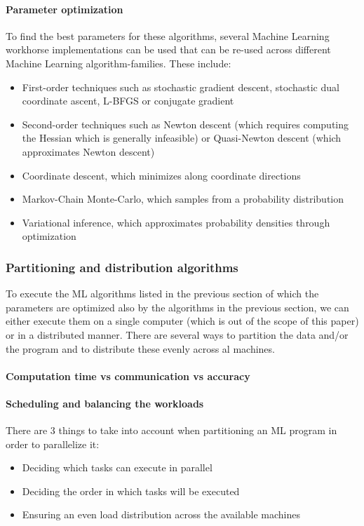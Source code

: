 \paragraph{Parameter optimization}
To find the best parameters for these algorithms, several Machine Learning workhorse implementations can be used that can be re-used across different Machine Learning algorithm-families. These include:
\begin{itemize}
	\item First-order techniques such as stochastic gradient descent, stochastic dual coordinate ascent\cite{Shal13}, L-BFGS or conjugate gradient
	\item Second-order techniques such as Newton descent (which requires computing the Hessian which is generally infeasible) or Quasi-Newton descent (which approximates Newton descent)
	\item Coordinate descent, which minimizes along coordinate directions
	\item Markov-Chain Monte-Carlo, which samples from a probability distribution
	\item Variational inference\cite{Blei17}, which approximates probability densities through optimization
\end{itemize}




\subsubsection{Partitioning and distribution algorithms}
To execute the ML algorithms listed in the previous section of which the parameters are optimized also by the algorithms in the previous section, we can either execute them on a single computer (which is out of the scope of this paper) or in a distributed manner. There are several ways to partition the data and/or the program and to distribute these evenly across al machines.


\paragraph{Computation time vs communication vs accuracy}


\paragraph{Scheduling and balancing the workloads}
There are 3 things to take into account when partitioning an ML program in order to parallelize it:\cite{Xing16}\\
\begin{itemize}
	\item Deciding which tasks can execute in parallel
	\item Deciding the order in which tasks will be executed
	\item Ensuring an even load distribution across the available machines
\end{itemize}


